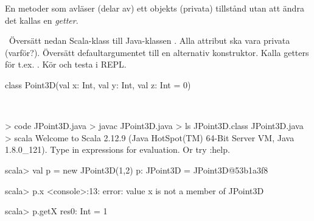 \SubtaskSolved En metoder som avläser (delar av) ett objekts (privata) tillstånd utan att ändra det kallas en \emph{getter}.

\QUESTEND



\QUESTBEGIN

\Task \what~Översätt nedan Scala-klass till Java-klassen . Alla attribut ska vara privata (varför?). Översätt defaultargumentet till en alternativ konstruktor. Kalla getters för t.ex. . Kör  och testa i REPL.

\begin{Code}
class Point3D(val x: Int, val y: Int, val z: Int = 0)
\end{Code}

\SOLUTION

\TaskSolved \what~


\begin{REPL}
> code JPoint3D.java
> javac JPoint3D.java
> ls
JPoint3D.class  JPoint3D.java
> scala
Welcome to Scala 2.12.9 (Java HotSpot(TM) 64-Bit Server VM, Java 1.8.0_121).
Type in expressions for evaluation. Or try :help.

scala> val p = new JPoint3D(1,2)
p: JPoint3D = JPoint3D@53b1a3f8

scala> p.x
<console>:13: error: value x is not a member of JPoint3D

scala> p.getX
res0: Int = 1
\end{REPL}

\QUESTEND




\QUESTBEGIN


